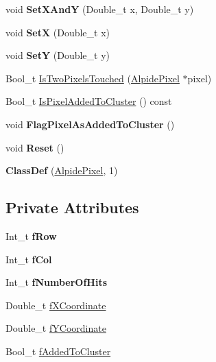 \begin{DoxyCompactItemize}
\item 
\mbox{\label{class_alpide_pixel_a421d61832be201b8e428261d241b2112}} 
void {\bfseries Set\+X\+AndY} (Double\+\_\+t x, Double\+\_\+t y)
\item 
\mbox{\label{class_alpide_pixel_a14cff7f77ec17c0eb630d3af95bd6140}} 
void {\bfseries SetX} (Double\+\_\+t x)
\item 
\mbox{\label{class_alpide_pixel_a7230e4b812c3344789db2017c75f16ed}} 
void {\bfseries SetY} (Double\+\_\+t y)
\item 
Bool\+\_\+t \mbox{\hyperlink{class_alpide_pixel_a48184caa692d77f6c4ad70e25f18a69b}{Is\+Two\+Pixels\+Touched}} (\mbox{\hyperlink{class_alpide_pixel}{Alpide\+Pixel}} $\ast$pixel)
\item 
Bool\+\_\+t \mbox{\hyperlink{class_alpide_pixel_af532dfd2d03d8ad769b9f4ec12f5df1f}{Is\+Pixel\+Added\+To\+Cluster}} () const
\item 
\mbox{\label{class_alpide_pixel_a2e78f8c88f7bc9c37e5646afd534ebf3}} 
void {\bfseries Flag\+Pixel\+As\+Added\+To\+Cluster} ()
\item 
\mbox{\label{class_alpide_pixel_a8d76bcc687374b3a462c533f747f061a}} 
void {\bfseries Reset} ()
\item 
\mbox{\label{class_alpide_pixel_a78d2c1e3548287ce5c05668ba7dbec0f}} 
{\bfseries Class\+Def} (\mbox{\hyperlink{class_alpide_pixel}{Alpide\+Pixel}}, 1)
\end{DoxyCompactItemize}
\subsection*{Private Attributes}
\begin{DoxyCompactItemize}
\item 
\mbox{\label{class_alpide_pixel_aa0e9d04eec9253f63ebe26882aa04e39}} 
Int\+\_\+t {\bfseries f\+Row}
\item 
\mbox{\label{class_alpide_pixel_a80151cc0e4cdf1fc1aa265d49df36fcc}} 
Int\+\_\+t {\bfseries f\+Col}
\item 
\mbox{\label{class_alpide_pixel_afae3655c40885515ec07cf70f4641f8c}} 
Int\+\_\+t {\bfseries f\+Number\+Of\+Hits}
\item 
Double\+\_\+t \mbox{\hyperlink{class_alpide_pixel_a10324596fb2e133158add1bb476a94fe}{f\+X\+Coordinate}}
\item 
Double\+\_\+t \mbox{\hyperlink{class_alpide_pixel_a603313fe11571d8db63a05c26711e691}{f\+Y\+Coordinate}}
\item 
Bool\+\_\+t \mbox{\hyperlink{class_alpide_pixel_aba15cede4c878ffeccb6ad389ac37088}{f\+Added\+To\+Cluster}}
\end{DoxyCompactItemize}


